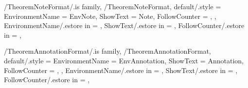 \newcommand{\InitTheoremProofFormat}
{%
  \theoremstyle{definition}%
  \ifthenelse{\equal{\GetTheoremProofFormatFollowCounter}{\empty}}%
  {%
    \newtheorem*{%
      \GetTheoremProofFormatEnvironmentName}{%
      \GetTheoremProofFormatShowText}
  }%
  {%
    \newtheorem{%
      \GetTheoremProofFormatEnvironmentName}{%
      \GetTheoremProofFormatShowText}[%
      \GetTheoremProofFormatFollowCounter]%
  }%
} %


\pgfkeys
{
  /TheoremNoteFormat/.is family, /TheoremNoteFormat,
  default/.style =
  {
    EnvironmentName = {EnvNote},
    ShowText = {Note},
    FollowCounter = \empty,
  },
  EnvironmentName/.estore in = \GetTheoremNoteFormatEnvironmentName,
  ShowText/.estore in = \GetTheoremNoteFormatShowText,
  FollowCounter/.estore in = \GetTheoremNoteFormatFollowCounter,
} %

\newcommand{\InsertNote}[1]
{%
  \InsertTheoremContent[\empty]{%
    \GetTheoremNoteFormatEnvironmentName}{#1}%
} %

\newcommand{\InitTheoremNoteFormat}
{%
  \theoremstyle{definition}%
  \ifthenelse{\equal{\GetTheoremNoteFormatFollowCounter}{\empty}}%
  {%
    \newtheorem*{%
      \GetTheoremNoteFormatEnvironmentName}{%
      \GetTheoremNoteFormatShowText}
  }%
  {%
    \newtheorem{%
      \GetTheoremNoteFormatEnvironmentName}{%
      \GetTheoremNoteFormatShowText}[%
      \GetTheoremNoteFormatFollowCounter]%
  }%
} %


\pgfkeys
{
  /TheoremAnnotationFormat/.is family, /TheoremAnnotationFormat,
  default/.style =
  {
    EnvironmentName = {EnvAnnotation},
    ShowText = {Annotation},
    FollowCounter = \empty,
  },
  EnvironmentName/.estore in = \GetTheoremAnnotationFormatEnvironmentName,
  ShowText/.estore in = \GetTheoremAnnotationFormatShowText,
  FollowCounter/.estore in = \GetTheoremAnnotationFormatFollowCounter,
} %

\newcommand{\InsertAnnotation}[1]
{%
  \InsertTheoremContent[\empty]{%
    \GetTheoremAnnotationFormatEnvironmentName}{#1}%
} %

\newcommand{\InitTheoremAnnotationFormat}
{%
  \theoremstyle{definition}%
  \ifthenelse{\equal{\GetTheoremAnnotationFormatFollowCounter}{\empty}}%
  {%
    \newtheorem*{%
      \GetTheoremAnnotationFormatEnvironmentName}{%
      \GetTheoremAnnotationFormatShowText}
  }%
  {%
    \newtheorem{%
      \GetTheoremAnnotationFormatEnvironmentName}{%
      \GetTheoremAnnotationFormatShowText}[%
      \GetTheoremAnnotationFormatFollowCounter]%
  }%
} %

